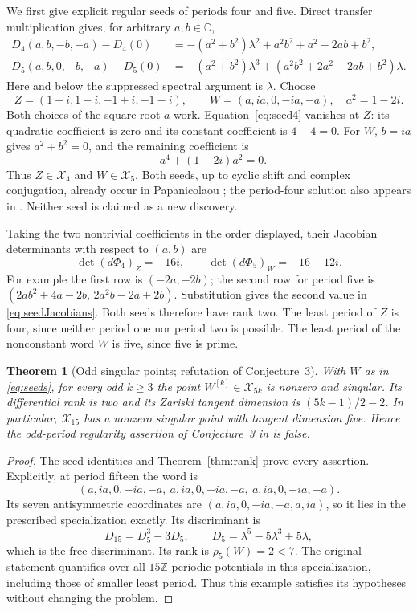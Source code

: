 \documentclass[11pt,a4paper]{article}
\newtheorem{theorem}{Theorem}
\theoremstyle{definition}
\theoremstyle{remark}
\newcommand{\C}{\mathbb C}
\newcommand{\Z}{\mathbb Z}
\newcommand{\X}{\mathcal X}
\begin{document}
We first give explicit regular seeds of periods four and five. Direct
transfer multiplication gives, for arbitrary $a,b\in\C$,
\begin{align}
 D_4(a,b,-b,-a)-D_4(0)
  &=-(a^2+b^2)\lambda^2+a^2b^2+a^2-2ab+b^2,\label{eq:seed4}\\
 D_5(a,b,0,-b,-a)-D_5(0)
  &=-(a^2+b^2)\lambda^3
     +(a^2b^2+2a^2-2ab+b^2)\lambda.\label{eq:seed5}
\end{align}
Here and below the suppressed spectral argument is $\lambda$.
Choose
\begin{equation}\label{eq:seeds}
 Z=(1+i,1-i,-1+i,-1-i),\qquad
 W=(a,ia,0,-ia,-a),\quad a^2=1-2i.
\end{equation}
Both choices of the square root $a$ work. Equation~\eqref{eq:seed4} vanishes
at $Z$: its quadratic coefficient is zero and its constant coefficient is
$4-4=0$. For $W$, $b=ia$ gives $a^2+b^2=0$, and the remaining coefficient is
\[
 -a^4+(1-2i)a^2=0.
\]
Thus $Z\in\X_4$ and $W\in\X_5$. Both seeds, up to cyclic shift and complex
conjugation, already occur in Papanicolaou \cite[Example~3(ii)--(iii),
pp.~807--809]{Papanicolaou}; the period-four solution also appears in
\cite{FLMPRTTZ}. Neither seed is claimed as a new discovery.

Taking the two nontrivial coefficients in the order displayed, their
Jacobian determinants with respect to $(a,b)$ are
\begin{equation}\label{eq:seedJacobians}
 \det(d\Phi_4)_Z=-16i,\qquad
 \det(d\Phi_5)_W=-16+12i.
\end{equation}
For example the first row is $(-2a,-2b)$; the second row for period five
is $(2ab^2+4a-2b,\,2a^2b-2a+2b)$. Substitution gives the second value in
\eqref{eq:seedJacobians}. Both seeds therefore have rank two.
The least period of $Z$ is four, since neither period one nor period two
is possible. The least period of the nonconstant word $W$ is five, since
five is prime.

\begin{theorem}[Odd singular points; refutation of Conjecture~3]\label{thm:odd}
With $W$ as in \eqref{eq:seeds}, for every odd $k\geq3$ the point
$W^{[k]}\in\X_{5k}$ is nonzero and singular. Its differential rank is two
and its Zariski tangent dimension is $(5k-1)/2-2$.
In particular, $\X_{15}$ has a nonzero singular point with tangent dimension
five. Hence the odd-period regularity assertion of Conjecture~3 in
\cite{FFORS} is false.
\end{theorem}
\begin{proof}
The seed identities and Theorem~\ref{thm:rank} prove every assertion.
Explicitly, at period fifteen the word is
\[
 (a,ia,0,-ia,-a,\ a,ia,0,-ia,-a,\ a,ia,0,-ia,-a).
\]
Its seven antisymmetric coordinates are
$(a,ia,0,-ia,-a,a,ia)$, so it lies in the prescribed specialization exactly.
Its discriminant is
\[
 D_{15}=D_5^3-3D_5,
 \qquad D_5=\lambda^5-5\lambda^3+5\lambda,
\]
which is the free discriminant. Its rank is $\rho_5(W)=2<7$.
The original statement quantifies over all $15\Z$-periodic potentials in
this specialization, including those of smaller least period. Thus this
example satisfies its hypotheses without changing the problem.
\end{proof}
\end{document}
